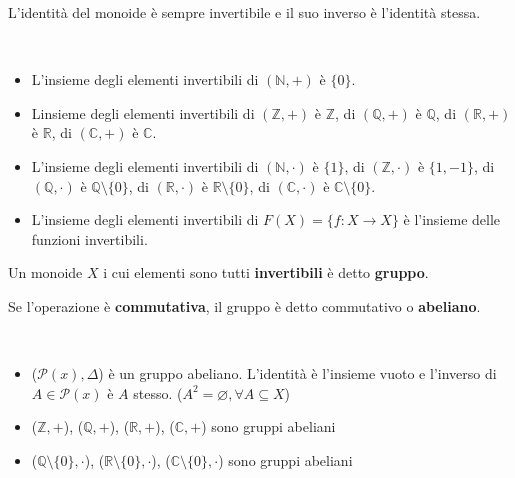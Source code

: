 \documentclass[../main.tex]{subfiles}
\begin{document}
\begin{remark}
    L'identità del monoide è sempre invertibile e il suo inverso è l'identità stessa.
\end{remark}

\begin{example}
    \
    \begin{itemize}
        \item L'insieme degli elementi invertibili di $(\mathbb{N},+)$ è $\{0\}$.
        \item Linsieme degli elementi invertibili di $(\mathbb{Z},+)$ è $\mathbb{Z}$, di $(\mathbb{Q},+)$ è $\mathbb{Q}$, di $(\mathbb{R},+)$ è $\mathbb{R}$, di $(\mathbb{C},+)$ è $\mathbb{C}$.
        \item L'insieme degli elementi invertibili di $(\mathbb{N},\cdot)$ è $\{1\}$, di $(\mathbb{Z},\cdot)$ è $\{1,-1\}$, di $(\mathbb{Q},\cdot)$ è $\mathbb{Q} \setminus \{0\}$, di $(\mathbb{R},\cdot)$ è $\mathbb{R} \setminus \{0\}$, di $(\mathbb{C},\cdot)$ è $\mathbb{C} \setminus \{0\}$.
        \item L'insieme degli elementi invertibili di $F(X) = \{f: X \rightarrow X\}$ è l'insieme delle funzioni invertibili.
    \end{itemize}
\end{example}

\begin{definition}[Gruppo]
    Un monoide $X$ i cui elementi sono tutti \textbf{invertibili} è detto \textbf{gruppo}.

    Se l'operazione è \textbf{commutativa}, il gruppo è detto commutativo o \textbf{abeliano}.
\end{definition}

\newpage

\begin{example}
    \
    \begin{itemize}
        \item ($\mathcal{P}(x) ,\Delta $) è un gruppo abeliano. L'identità è l'insieme vuoto e l'inverso di $A \in \mathcal{P}(x)$ è $A$ stesso. ($A^2 = \varnothing,  \forall A \subseteq X $)
        \item ($\mathbb{Z},+$), ($\mathbb{Q},+$), ($\mathbb{R},+$), ($\mathbb{C},+$) sono gruppi abeliani
        \item ($\mathbb{Q}\setminus \{0\}, \cdot$), ($\mathbb{R}\setminus \{0\}, \cdot$), ($\mathbb{C}\setminus \{0\}, \cdot$) sono gruppi abeliani
    \end{itemize}
\end{example}
\end{document}
